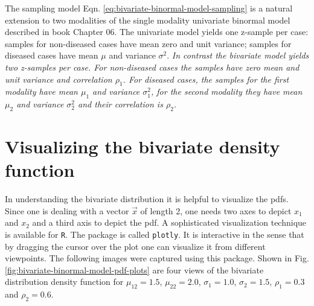 \documentclass[
]{book}
\begin{document}
The sampling model Eqn. \eqref{eq:bivariate-binormal-model-sampling} is a natural extension to two modalities of the single modality univariate binormal model described in book Chapter 06. The univariate model yields one z-sample per case: samples for non-diseased cases have mean zero and unit variance; samples for diseased cases have mean \(\mu\) and variance \(\sigma^2\). \emph{In contrast the bivariate model yields two z-samples per case. For non-diseased cases the samples have zero mean and unit variance and correlation \(\rho_1\). For diseased cases, the samples for the first modality have mean \(\mu_1\) and variance \(\sigma_1^2\), for the second modality they have mean \(\mu_2\) and variance \(\sigma_2^2\) and their correlation is \(\rho_2\).}

\hypertarget{bivariate-binormal-model-multivariate-density-visualization}{%
\section{Visualizing the bivariate density function}\label{bivariate-binormal-model-multivariate-density-visualization}}

In understanding the bivariate distribution it is helpful to visualize the pdfs. Since one is dealing with a vector \(\overrightarrow{x}\) of length 2, one needs two axes to depict \(x_1\) and \(x_2\) and a third axis to depict the pdf. A sophisticated visualization technique is available for \texttt{R}. The package is called \texttt{plotly}. It is interactive in the sense that by dragging the cursor over the plot one can visualize it from different viewpoints. The following images were captured using this package. Shown in Fig. \ref{fig:bivariate-binormal-model-pdf-plots} are four views of the bivariate distribution density function for \(\mu_{12} = 1.5\), \(\mu_{22} = 2.0\), \(\sigma_1 = 1.0\), \(\sigma_2 = 1.5\), \(\rho_1 = 0.3\) and \(\rho_2 = 0.6\).
\end{document}
